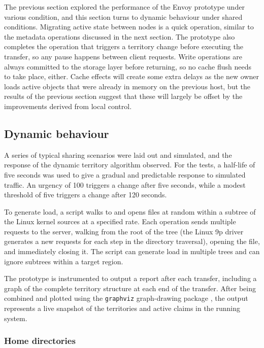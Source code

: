 The previous section explored the performance of the Envoy prototype under various condition, and this section turns to dynamic behaviour under shared conditions. Migrating active state between nodes is a quick operation, similar to the metadata operations discussed in the next section. The prototype also completes the operation that triggers a territory change before executing the transfer, so any pause happens between client requests. Write operations are always committed to the storage layer before returning, so no cache flush needs to take place, either. Cache effects will create some extra delays as the new owner loads active objects that were already in memory on the previous host, but the results of the previous section suggest that these will largely be offset by the improvements derived from local control.

\subsection{Dynamic behaviour}

A series of typical sharing scenarios were laid out and simulated, and the response of the dynamic territory algorithm observed. For the tests, a half-life of five seconds was used to give a gradual and predictable response to simulated traffic. An urgency of 100 triggers a change after five seconds, while a modest threshold of five triggers a change after 120 seconds.

To generate load, a script walks to and opens files at random within a subtree of the Linux kernel sources at a specified rate. Each operation sends multiple requests to the server, walking from the root of the tree (the Linux 9p driver generates a new requests for each step in the directory traversal), opening the file, and immediately closing it. The script can generate load in multiple trees and can ignore subtrees within a target region.

The prototype is instrumented to output a report after each transfer, including a graph of the complete territory structure at each end of the transfer. After being combined and plotted using the \texttt{graphviz} graph-drawing package \cite{gansner}, the output represents a live snapshot of the territories and active claims in the running system.

\subsubsection{Home directories}

